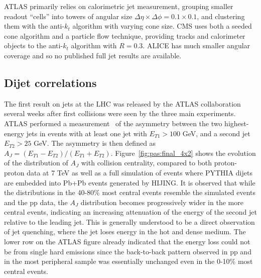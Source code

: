 ATLAS primarily relies on calorimetric jet measurement, grouping smaller readout ``cells''      
into towers of angular size $\Delta \eta \times \Delta \phi = 0.1 \times 0.1$, and 
clustering them with the anti-$k_t$ algorithm with varying cone size.
CMS uses both a seeded cone algorithm and a 
particle flow technique, providing tracks and calorimeter objects to the 
anti-$k_t$ algorithm with $R=0.3$.
ALICE has much smaller angular coverage and so no published full jet results are available.

\subsection{Dijet correlations}

The first result on jets at the LHC was released by the ATLAS collaboration 
several weeks after first collisions were seen by the three main experiments.  
ATLAS performed a measurement~\cite{Aad:2010bu} of
the asymmetry between the two highest-energy jets in events with at least one jet
with $E_{T1} > 100$ GeV, and a second jet $E_{T2} > 25$ GeV.  The asymmetry is
then defined as $A_J = (E_{T1} - E_{T2})/(E_{T1} + E_{T2})$.
Figure~\ref{fig:pas:final_4x2} shows the evolution of the distribution of
$A_J$ with collision centrality, compared to both proton-proton data at 7 TeV
as well as a full simulation of events where PYTHIA dijets are embedded into
Pb+Pb events generated by HIJING.
It is observed that while the distributions in the 40-80\% most central events
resemble the simulated events and the pp data, the $A_J$ distribution becomes
progressively wider in the more central events, indicating an increasing attenuation
of the energy of the second jet relative to the leading jet.  This is generally
understood to be a direct observation of jet quenching, where the jet loses energy
in the hot and dense medium.
The lower row on the ATLAS figure already indicated that the energy loss could not be
from single hard emissions since the back-to-back pattern observed in pp and in
the most peripheral sample was essentially unchanged even in the 0-10\% most
central events.

